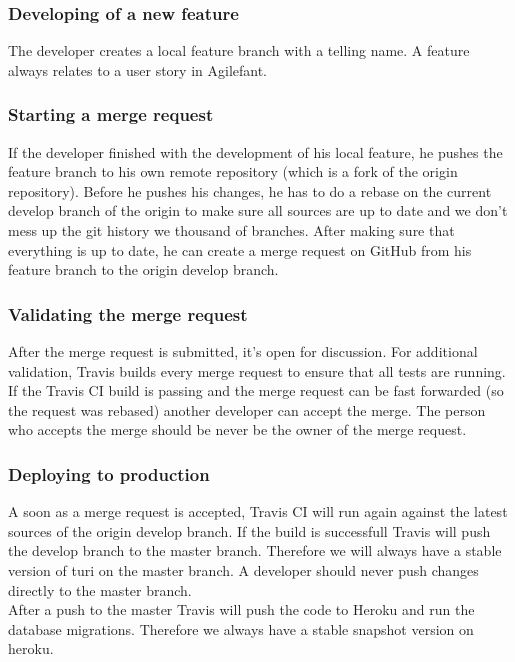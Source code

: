 \documentclass[a4paper]{article}
\begin{document}
\subsubsection{Developing of a new feature}
The developer creates a local feature branch with a telling name. A feature always relates to a user story in Agilefant.


\subsubsection{Starting a merge request}
If the developer finished with the development of his local feature, he pushes the feature branch to his own remote repository (which is a fork of the origin repository). Before he pushes his changes, he has to do a rebase on the current develop branch of the origin to make sure all sources are up to date and we don't mess up the git history we thousand of branches. After making sure that everything is up to date, he can create a merge request on GitHub from his feature branch to the origin develop branch.

\subsubsection{Validating the merge request}
After the merge request is submitted, it's open for discussion. For additional validation, Travis builds every merge request to ensure that all tests are running. If the Travis CI build is passing and the merge request can be fast forwarded (so the request was rebased) another developer can accept the merge. The person who accepts the merge should be never be the owner of the merge request.

\subsubsection{Deploying to production}
A soon as a merge request is accepted, Travis CI will run again against the latest sources of the origin develop branch. If the build is successfull Travis will push the develop branch to the master branch. Therefore we will always have a stable version of turi on the master branch. A developer should never push changes directly to the master branch.\\

\noindent
After a push to the master Travis will push the code to Heroku and run the database migrations. Therefore we always have a stable snapshot version on heroku.
\end{document}
